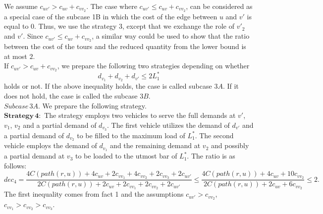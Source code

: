 \indent  We assume $c_{uv'} > c_{uv} + c_{vv_2}$. The case where $c_{uv'} \le c_{uv} + c_{vv_2}$, can be considered as a special case of the subcase 1B in which the cost of the edge between $u$ and $v'$ is equal to $0$. Thus, we use the strategy 3, except that we exchange the role of $v'_2$ and $v'$. Since $c_{uv'} \le c_{uv}+c_{vv_2}$, a similar way could be used to show that the ratio between the cost of the tours and the reduced quantity from the lower bound is at most $2$. \\
\indent If $c_{uv'} > c_{uv} + c_{vv_2}$, we prepare the following two strategies depending on whether 
$$d_{v_1}+d_{v_2}+d_{v'} \le 2L_1^*$$
\noindent  holds or not. If the above inequality holds, the case is called subcase $3A$. If it does not hold, the case is called the subcase $3B$. \\

\indent $Subcase \,3A.$ We prepare the following strategy.\\
\indent $\mathbf{Strategy \,4}:$ The strategy employs two vehicles to serve the full demands at $v'$, $v_1$, $v_2$ and a partial demand of $d_{v_3}$. The first vehicle utilizes the demand of $d_{v'}$ and a partial demand of $d_{v_2}$ to be filled to the maximum load of $L_1^*$. The second vehicle employs the demand of $d_{v_1}$ and the remaining demand at $v_2$ and possibly a partial demand at $v_3$ to be loaded to the utmost bar of $L_1^*$. The ratio is as follows: 
$$dec_4=\frac{4C(path(r,u))+4c_{uv}+2c_{vv_1}+4c_{vv_2}+2c_{vv_3}+2c_{uv'}}{2C(path(r,u))+2c_{uv}+2c_{vv_1}+2c_{vv_2}+2c_{uv'}} \le \frac{4C(path(r,u))+4c_{uv}+10c_{vv_2}}{2C(path(r,u))+2c_{uv}+6c_{vv_2}} \le 2.$$
\noindent The first inequality comes from fact 1 and the assumptions $c_{uv'} > c_{vv_2}$, $c_{vv_1} > c_{vv_2} > c_{vv_3}$.\\

